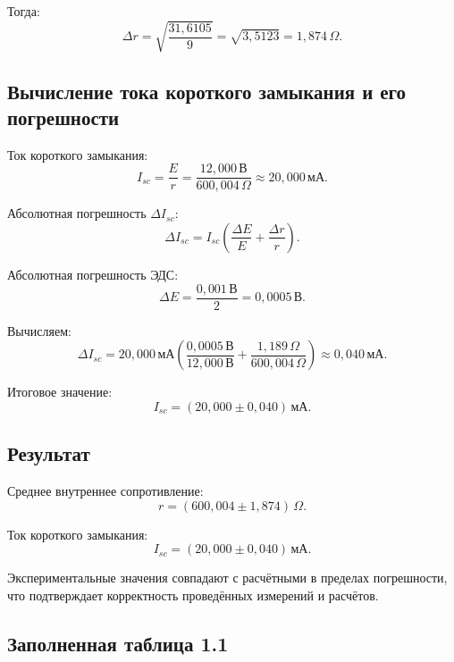 Тогда:
\[
	\Delta r = \sqrt{\frac{31{,}6105}{9}} = \sqrt{3{,}5123} = 1{,}874\,\Omega.
\]

\subsection{Вычисление тока короткого замыкания и его погрешности}

Ток короткого замыкания:
\[
	I_{sc} = \frac{E}{r} = \frac{12{,}000\,\text{В}}{600{,}004\,\Omega} \approx 20{,}000\,\text{мА}.
\]

Абсолютная погрешность \( \Delta I_{sc} \):
\[
	\Delta I_{sc} = I_{sc} \left( \frac{\Delta E}{E} + \frac{\Delta r}{r} \right).
\]

Абсолютная погрешность ЭДС:
\[
	\Delta E = \frac{0{,}001\,\text{В}}{2} = 0{,}0005\,\text{В}.
\]

Вычисляем:
\[
	\Delta I_{sc} = 20{,}000\,\text{мА} \left( \frac{0{,}0005\,\text{В}}{12{,}000\,\text{В}} + \frac{1{,}189\,\Omega}{600{,}004\,\Omega} \right) \approx 0{,}040\,\text{мА}.
\]

Итоговое значение:
\[
	I_{sc} = (20{,}000 \pm 0{,}040)\,\text{мА}.
\]

\subsection{Результат}

Среднее внутреннее сопротивление:
\[
	r = (600{,}004 \pm 1{,}874)\,\Omega.
\]

Ток короткого замыкания:
\[
	I_{sc} = (20{,}000 \pm 0{,}040)\,\text{мА}.
\]

Экспериментальные значения совпадают с расчётными в пределах погрешности, что подтверждает корректность проведённых измерений и расчётов.


\subsection{Заполненная таблица 1.1}

